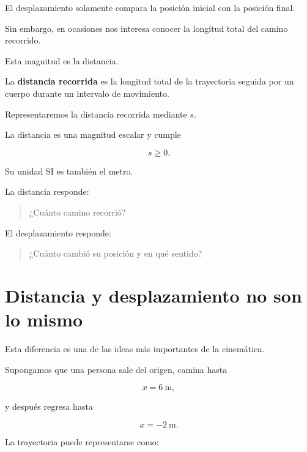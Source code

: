 El desplazamiento solamente compara la posición inicial con la posición
final.

Sin embargo, en ocasiones nos interesa conocer la longitud total del camino
recorrido.

Esta magnitud es la distancia.

\begin{definicion}
La \textbf{distancia recorrida} es la longitud total de la trayectoria
seguida por un cuerpo durante un intervalo de movimiento.
\end{definicion}

Representaremos la distancia recorrida mediante \(s\).

La distancia es una magnitud escalar y cumple

\[ s\geq 0. \]

Su unidad SI es también el metro.

\begin{idea}
La distancia responde:

\begin{quote}
¿Cuánto camino recorrió?
\end{quote}

El desplazamiento responde:

\begin{quote}
¿Cuánto cambió su posición y en qué sentido?
\end{quote}
\end{idea}


\section{Distancia y desplazamiento no son lo mismo}

Esta diferencia es una de las ideas más importantes de la cinemática.

Supongamos que una persona sale del origen, camina hasta

\[ x=\SI{6}{\meter}, \]

y después regresa hasta

\[ x=-\SI{2}{\meter}. \]

La trayectoria puede representarse como:

\begin{center}
\end{center}

